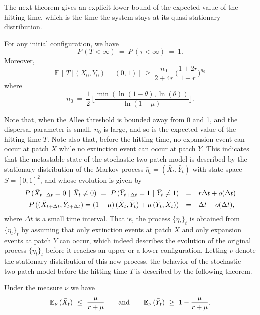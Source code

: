  The next theorem gives an explicit lower bound of the expected value of the hitting time, which is the time the
 system stays at its quasi-stationary distribution.
\begin{theorem}[metastability]
\label{metastability}
 For any initial configuration, we have
 $$ P \,(T < \infty) \ = \ P \,(\tau < \infty) \ = \ 1. $$
 Moreover, $$ {\mathbb{E}} \,[\,T \,| \,(X_0, Y_0) = (0, 1)] \ \geq \ \frac{n_0}{2 + 4r} \ \bigg(\frac{1 + 2r}{1 + r} \bigg)^{n_0} $$
 where $$ n_0 \ = \ \frac{1}{2} \, \bigg\lfloor \frac{\min (\ln (1 - \theta), \ln (\theta))}{\ln (1 - \mu)} \bigg\rfloor. $$
\end{theorem}
 Note that, when the Allee threshold is bounded away from 0 and 1, and the dispersal parameter is small, $n_0$ is large, and so
 is the expected value of the hitting time $T$.
 Note also that, before the hitting time, no expansion event can occur at patch $X$ while no extinction event can occur at patch $Y$.
 This indicates that the metastable state of the stochastic two-patch model is described by the stationary distribution of the
 Markov process $\bar \eta_t = (\bar X_t, \bar Y_t)$ with state space $S = [0, 1]^2$, and whose evolution is given by
 $$ \begin{array}{rcl}
  P \,(\bar X_{t + \Delta t} = 0 \ | \ \bar X_t \neq 0) \ = \
  P \,(\bar Y_{t + \Delta t} = 1 \ | \ \bar Y_t \neq 1) & = & r \Delta t + o (\Delta t) \vspace{4pt} \\
  P \,((\bar X_{t + \Delta t}, \bar Y_{t + \Delta t}) = (1 - \mu) \,(\bar X_t, \bar Y_t) + \mu \,(\bar Y_t, \bar X_t)) & = & \Delta t + o (\Delta t), \end{array} $$
 where $\Delta t$ is a small time interval.
 That is, the process $\{\bar \eta_t \}_t$ is obtained from $\{\eta_t \}_t$ by assuming that only extinction events at patch $X$
 and only expansion events at patch $Y$ can occur, which indeed describes the evolution of the original process $\{\eta_t \}_t$
 before it reaches an upper or a lower configuration.
 Letting $\nu$ denote the stationary distribution of this new process, the behavior of the stochastic two-patch model before
 the hitting time $T$ is described by the following theorem.
\begin{theorem}
\label{metastable}
 Under the measure $\nu$ we have
 $$ {\mathbb{E}}_{\nu} \,(\bar X_t) \ \leq \  \frac{\mu}{r + \mu} \qquad \hbox{and} \qquad
    {\mathbb{E}}_{\nu} \,(\bar Y_t) \ \geq \ 1- \frac{\mu}{r + \mu}. $$
\end{theorem}
